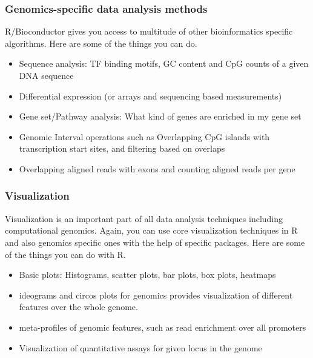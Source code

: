 \documentclass[12pt,]{krantz}
\providecommand{\tightlist}{%
  \setlength{\itemsep}{0pt}\setlength{\parskip}{0pt}}
\begin{document}
\hypertarget{genomics-specific-data-analysis-methods}{%
\subsubsection{Genomics-specific data analysis methods}\label{genomics-specific-data-analysis-methods}}

R/Bioconductor gives you access to multitude of other bioinformatics specific algorithms. Here are some of the things you can do.

\begin{itemize}
\tightlist
\item
  Sequence analysis: TF binding motifs, GC content and CpG counts of a given DNA sequence
\item
  Differential expression (or arrays and sequencing based measurements)
\item
  Gene set/Pathway analysis: What kind of genes are enriched in my gene set
\item
  Genomic Interval operations such as Overlapping CpG islands with transcription start sites, and filtering based on overlaps
\item
  Overlapping aligned reads with exons and counting aligned reads per gene
\end{itemize}

\hypertarget{visualization}{%
\subsubsection{Visualization}\label{visualization}}

Visualization is an important part of all data analysis techniques including computational genomics. Again, you can use core visualization techniques in R and also genomics specific ones with the help of specific packages. Here are some of the things you can do with R.

\begin{itemize}
\tightlist
\item
  Basic plots: Histograms, scatter plots, bar plots, box plots, heatmaps
\item
  ideograms and circos plots for genomics provides visualization of different features over the whole genome.
\item
  meta-profiles of genomic features, such as read enrichment over all promoters
\item
  Visualization of quantitative assays for given locus in the genome
\end{itemize}
\end{document}
